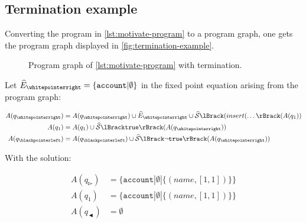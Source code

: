 \subsection{Termination example}\label{subsec:termination-example}

Converting the program in \autoref{lst:motivate-program} to a program graph, one gets the program graph displayed in \autoref{fig:termination-example}.

\begin{figure}
    \centering
    
    \caption{Program graph of \autoref{lst:motivate-program} with termination.}
    \label{fig:termination-example}
\end{figure}

Let $\ab{E}_\whitepointerright = \{ \texttt{account} | \emptyset \}$ in the fixed point equation arising from the program graph:

\begin{align}
    A(q_\whitepointerright) &= A(q_\whitepointerright) \cup \ab{E}_\whitepointerright \cup \abssem{(insert(\dots}(A(q_1)) \\
    A(q_1) &= A(q_1) \cup \abssem{\texttt{true}}(A(q_\whitepointerright)) \\
    A(q_\blackpointerleft) &= A(q_\blackpointerleft) \cup \abssem{\neg\texttt{true}}(A(q_\whitepointerright))
\end{align}

With the solution:

\begin{align}
    A(q_\whitepointerright) &= \{ \texttt{account} | \emptyset | \{(name, [1, 1])\}\} \\
    A(q_1) &= \{ \texttt{account} | \emptyset | \{(name, [1, 1])\}\} \\
    A(q_\blackpointerleft) &= \emptyset
\end{align}
